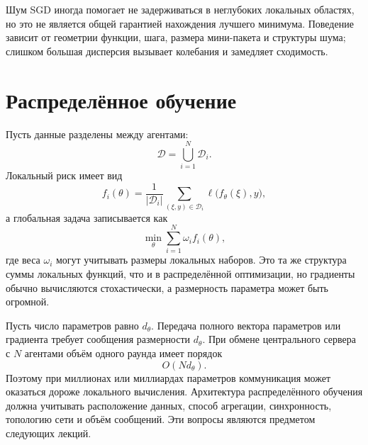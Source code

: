 Шум SGD иногда помогает не задерживаться в неглубоких локальных
областях, но это не является общей гарантией нахождения лучшего
минимума. Поведение зависит от геометрии функции, шага, размера
мини-пакета и структуры шума; слишком большая дисперсия вызывает
колебания и замедляет сходимость.

\section{Распределённое обучение}

Пусть данные разделены между агентами:
\[
    \mathcal D
    =
    \bigcup_{i=1}^{N}\mathcal D_i.
\]
Локальный риск имеет вид
\[
    f_i(\theta)
    =
    \frac1{|\mathcal D_i|}
    \sum_{(\xi,y)\in\mathcal D_i}
    \ell\bigl(f_\theta(\xi),y\bigr),
\]
а глобальная задача записывается как
\[
    \min_\theta
    \sum_{i=1}^{N}\omega_i f_i(\theta),
\]
где веса \(\omega_i\) могут учитывать размеры локальных наборов. Это
та же структура суммы локальных функций, что и в распределённой
оптимизации, но градиенты обычно вычисляются стохастически, а
размерность параметра может быть огромной.

Пусть число параметров равно \(d_\theta\). Передача полного вектора
параметров или градиента требует сообщения размерности \(d_\theta\).
При обмене центрального сервера с \(N\) агентами объём одного раунда
имеет порядок
\[
    O(Nd_\theta).
\]
Поэтому при миллионах или миллиардах параметров коммуникация может
оказаться дороже локального вычисления. Архитектура распределённого
обучения должна учитывать расположение данных, способ агрегации,
синхронность, топологию сети и объём сообщений. Эти вопросы являются
предметом следующих лекций.
